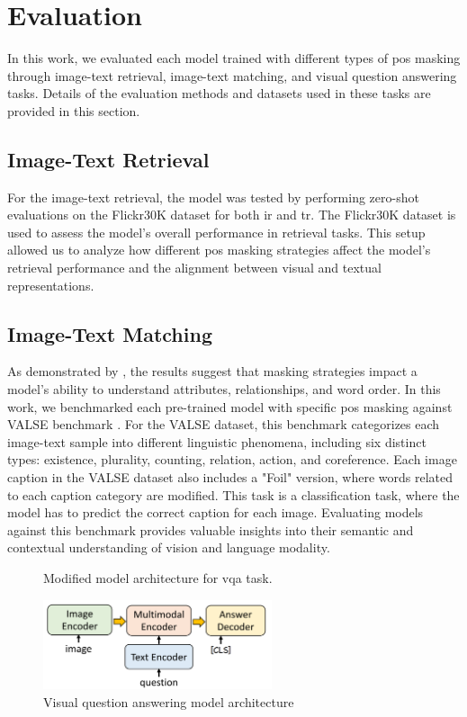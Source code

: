 \section{Evaluation}
In this work, we evaluated each model trained with different types of \acrshort{pos} masking through image-text retrieval, image-text matching, and visual question answering tasks.  
Details of the evaluation methods and datasets used in these tasks are provided in this section.  

\subsection{Image-Text Retrieval}
For the image-text retrieval, the model was tested by performing zero-shot evaluations on the Flickr30K \cite{flickr30k} dataset for both \acrfull{ir} and \acrfull{tr}.  
The Flickr30K dataset is used to assess the model's overall performance in retrieval tasks.
This setup allowed us to analyze how different \acrshort{pos} masking strategies affect the model's retrieval performance and the alignment between visual and textual representations.  

\subsection{Image-Text Matching}
As demonstrated by , the results suggest that masking strategies impact a model’s ability to understand attributes, relationships, and word order.  
In this work, we benchmarked each pre-trained model with specific \acrshort{pos} masking against VALSE benchmark \cite{valse}.  
For the VALSE dataset, this benchmark categorizes each image-text sample into different linguistic phenomena, including six distinct types: existence, plurality, counting, relation, action, and coreference.  
Each image caption in the VALSE dataset also includes a "Foil" version, where words related to each caption category are modified.  
This task is a classification task, where the model has to predict the correct caption for each image.  
Evaluating models against this benchmark provides valuable insights into their semantic and contextual understanding of vision and language modality.  

\begin{figure}[h]
    \caption{Visual question answering model architecture}
    \label{fig:vqa}
    Modified model architecture for \acrshort{vqa} task.
    \begin{center}
        \includegraphics[width=0.6\textwidth]{Images/vqa_method.png}
    \end{center}
    \small
\end{figure}

